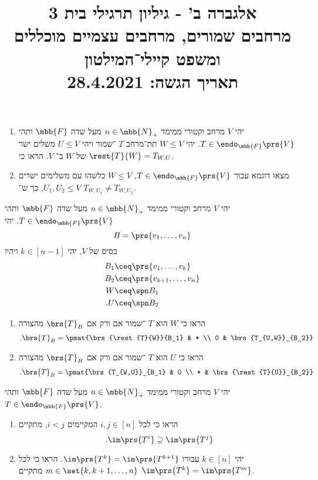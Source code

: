 \documentclass[a4paper,10pt,twoside,openany]{article}
\title{
אלגברה ב' - גיליון תרגילי בית 3 \\
מרחבים שמורים, מרחבים עצמיים מוכללים ומשפט קיילי־המילטון
\\
\small{תאריך הגשה: 28.4.2021} %
}
\date{}
\begin{document}
\maketitle

\begin{exercise}%
\begin{enumerate}
\item
יהי
$V$
מרחב וקטורי ממימד
$n \in \mbb{N}_+$
מעל שדה
$\mbb{F}$
ותהי
$T \in \endo_{\mbb{F}}\prs{V}$.
יהי
$W \leq V$
תת־מרחב
$T$%
־שמור ויהי
$U \leq V$
משלים ישר של
$W$
ב־%
$V$.
הראו כי
$\rest{T}{W} = T_{W,U}$.
\item
מצאו דוגמא עבור
$T \in \endo_{\mbb{F}}\prs{V}$,
$W \leq V$
כלשהו עם משלימים ישרים
$U_1, U_2 \leq V$,
כך ש־%
${T}_{W, U_1} \neq T_{W,U_2}$.
\end{enumerate}
\end{exercise}

\begin{exercise}%
יהי
$V$
מרחב וקטורי ממימד
$n \in \mbb{N}_+$
מעל שדה
$\mbb{F}$
ותהי
$T \in \endo_{\mbb{F}}\prs{V}$.
יהי
\[B = \prs{v_1, \ldots, v_n}\]
בסיס של
$V$,
יהי
$k \in [n-1]$
ויהיו
\begin{align*}
B_1 &\ceq \prs{v_1, \ldots, v_k} \\
B_2 &\ceq \prs{v_{k+1}, \ldots, v_n} \\
W &\ceq \spn B_1 \\
\text{.} U &\ceq \spn B_2
\end{align*}

\begin{enumerate}
\item הראו כי
$W$
הוא
$T$%
־שמור אם ורק אם
$\brs{T}_B$
מהצורה
\begin{align*}
\text{.} \brs{T}_B = \pmat{\brs{\rest{T}{W}}{B_1} & * \\ 0 & \brs{T_{U,W}}_{B_2}}
\end{align*}
\item הראו כי
$U$
הוא
$T$%
־שמור אם ורק אם
$\brs{T}_B$
מהצורה
\begin{align*}
\text{.} \brs{T}_B = \pmat{\brs{T_{W,U}}_{B_1} & 0 \\ * & \brs{\rest{T}{U}}_{B_2}}
\end{align*}
\end{enumerate}

\end{exercise}

\begin{exercise}%
יהי
$V$
מרחב וקטורי ממימד
$n \in \mbb{N}_+$
מעל שדה
$\mbb{F}$
ותהי
$T \in \endo_{\mbb{F}}\prs{V}$.

\begin{enumerate}
\item הראו כי לכל
$i,j \in [n]$
המקיימים
$i < j$,
מתקיים
\[\text{.} \im\prs{T^i} \supseteq \im\prs{T^j}\]
\item יהי
$k \in [n]$
עבורו
$\im\prs{T^k} = \im\prs{T^{k+1}}$.
הראו כי לכל
$m \in \set{k, k+1, \ldots, n}$
מתקיים
$\im\prs{T^k} = \im\prs{T^m}$.
\end{enumerate}
\end{exercise}
\end{document}
